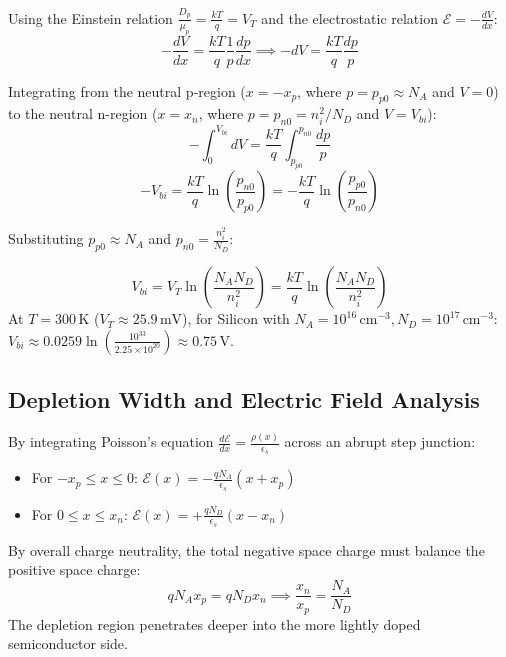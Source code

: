 \documentclass[12pt,a4paper]{article}
\begin{document}
Using the Einstein relation $\frac{D_p}{\mu_p} = \frac{kT}{q} = V_T$ and the electrostatic relation $\mathcal{E} = -\frac{dV}{dx}$:
\begin{equation}
  -\frac{dV}{dx} = \frac{k T}{q} \frac{1}{p} \frac{dp}{dx} \implies -dV = \frac{k T}{q} \frac{dp}{p}
\end{equation}

Integrating from the neutral p-region ($x = -x_p$, where $p = p_{p0} \approx N_A$ and $V = 0$) to the neutral n-region ($x = x_n$, where $p = p_{n0} = n_i^2/N_D$ and $V = V_{bi}$):
\begin{equation}
  -\int_0^{V_{bi}} dV = \frac{k T}{q} \int_{p_{p0}}^{p_{n0}} \frac{dp}{p}
\end{equation}
\begin{equation}
  -V_{bi} = \frac{k T}{q} \ln\left(\frac{p_{n0}}{p_{p0}}\right) = -\frac{k T}{q} \ln\left(\frac{p_{p0}}{p_{n0}}\right)
\end{equation}

Substituting $p_{p0} \approx N_A$ and $p_{n0} = \frac{n_i^2}{N_D}$:

\begin{tcolorbox}[formulabox, title={\textbf{Built-In Potential (Contact Potential)}}]
\begin{equation}
  V_{bi} = V_T \ln\left(\frac{N_A N_D}{n_i^2}\right) = \frac{k T}{q} \ln\left(\frac{N_A N_D}{n_i^2}\right)
\end{equation}
At $T = 300\,\text{K}$ ($V_T \approx 25.9\,\text{mV}$), for Silicon with $N_A = 10^{16}\,\text{cm}^{-3}, N_D = 10^{17}\,\text{cm}^{-3}$:
$V_{bi} \approx 0.0259 \ln\left(\frac{10^{33}}{2.25 \times 10^{20}}\right) \approx 0.75\,\text{V}$.
\end{tcolorbox}

\subsection{Depletion Width and Electric Field Analysis}
By integrating Poisson's equation $\frac{d\mathcal{E}}{dx} = \frac{\rho(x)}{\epsilon_s}$ across an abrupt step junction:
\begin{itemize}[leftmargin=*, itemsep=2pt]
  \item For $-x_p \le x \le 0$: $\mathcal{E}(x) = -\frac{q N_A}{\epsilon_s} (x + x_p)$
  \item For $0 \le x \le x_n$: $\mathcal{E}(x) = +\frac{q N_D}{\epsilon_s} (x - x_n)$
\end{itemize}

By overall charge neutrality, the total negative space charge must balance the positive space charge:
\begin{equation}
  q N_A x_p = q N_D x_n \implies \frac{x_n}{x_p} = \frac{N_A}{N_D}
\end{equation}
The depletion region penetrates deeper into the more lightly doped semiconductor side.
\end{document}
